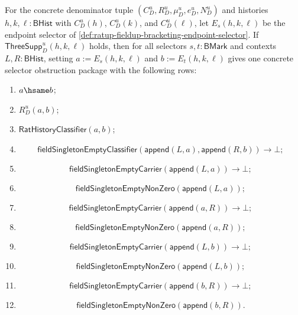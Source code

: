 \begin{theorem}
\label{thm:ratup-fieldup-bracketing-selector-complete-obstruction-package}
For the concrete denominator tuple $(C_D^u,R_D^u,\mu_D^u,e_D^u,N_D^u)$ and
histories $h,k,\ell:\mathsf{BHist}$ with $C_D^u(h)$, $C_D^u(k)$, and
$C_D^u(\ell)$, let $E_s(h,k,\ell)$ be the endpoint selector of
\autoref{def:ratup-fieldup-bracketing-endpoint-selector}. If
$\mathsf{ThreeSupp}_D^u(h,k,\ell)$ holds, then for all selectors
$s,t:\mathsf{BMark}$ and contexts $L,R:\mathsf{BHist}$, setting
$a:=E_s(h,k,\ell)$ and $b:=E_t(h,k,\ell)$ gives one concrete selector
obstruction package with the following rows:
\begin{enumerate}
  \item $a\hsame b$;
  \item $R_D^u(a,b)$;
  \item $\mathsf{RatHistoryClassifier}(a,b)$;
  \item
  $$
  \mathsf{fieldSingletonEmptyClassifier}
  (\mathsf{append}(L,a),\mathsf{append}(R,b))\to\bot;
  $$
  \item
  $$
  \mathsf{fieldSingletonEmptyCarrier}(\mathsf{append}(L,a))\to\bot;
  $$
  \item
  $$
  \mathsf{fieldSingletonEmptyNonZero}(\mathsf{append}(L,a));
  $$
  \item
  $$
  \mathsf{fieldSingletonEmptyCarrier}(\mathsf{append}(a,R))\to\bot;
  $$
  \item
  $$
  \mathsf{fieldSingletonEmptyNonZero}(\mathsf{append}(a,R));
  $$
  \item
  $$
  \mathsf{fieldSingletonEmptyCarrier}(\mathsf{append}(L,b))\to\bot;
  $$
  \item
  $$
  \mathsf{fieldSingletonEmptyNonZero}(\mathsf{append}(L,b));
  $$
  \item
  $$
  \mathsf{fieldSingletonEmptyCarrier}(\mathsf{append}(b,R))\to\bot;
  $$
  \item
  $$
  \mathsf{fieldSingletonEmptyNonZero}(\mathsf{append}(b,R)).
  $$
\end{enumerate}
\end{theorem}
